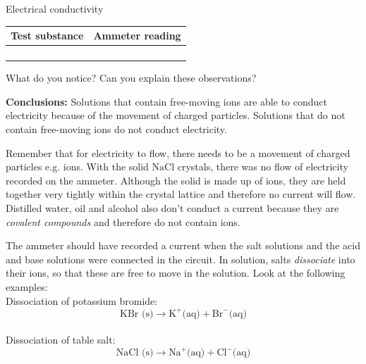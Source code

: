 \begin{g_experiment}{Electrical conductivity }
\begin{table}[H]
\begin{center}
      \begin{tabular}{|l|l|}\hline
        Test substance &
        Ammeter reading \\ \hline
         &
       \\ \hline
         &
       \\ \hline
         &
       \\ \hline
         &
    \\ \hline
    \end{tabular}
      \end{center}
\end{table}
        \label{m38720*id339669}What do you notice? Can you explain these observations?\par 
        \label{m38720*id339864}\noindent{}\textbf{Conclusions:}
          \newline
Solutions that contain free-moving ions are able to conduct electricity because of the movement of charged particles. Solutions that do not contain free-moving ions do not conduct electricity.
\end{g_experiment}
        \label{m38720*id339672}Remember that for electricity to flow, there needs to be a movement of charged particles e.g. ions. With the solid $\text{NaCl}$ crystals, there was no flow of electricity recorded on the ammeter. Although the solid is made up of ions, they are held together very tightly within the crystal lattice and therefore no current will flow. Distilled water, oil and alcohol also don't conduct a current because they are \textsl{covalent compounds} and therefore do not contain ions.\par 
        \label{m38720*id339687}The ammeter should have recorded a current when the salt solutions and the acid and base solutions were connected in the circuit. In solution, salts \textsl{dissociate} into their ions, so that these are free to move in the solution. Look at the following examples: \\
Dissociation of potassium bromide:
        \label{m38720*id339701}\nopagebreak\noindent        
    \begin{equation*}
    \text{KBr (s)} \to {\text{K}}^{+} \text{(aq)} + {\text{Br}}^{-} \text{(aq)}
      \end{equation*} \\
Dissociation of table salt:\\
        \label{m38720*id339737}\nopagebreak\noindent          
    \begin{equation*}
    \text{NaCl (s)}\to {\text{Na}}^{+} \text{(aq)} + {\text{Cl}}^{-} \text{(aq)}
      \end{equation*}\\
